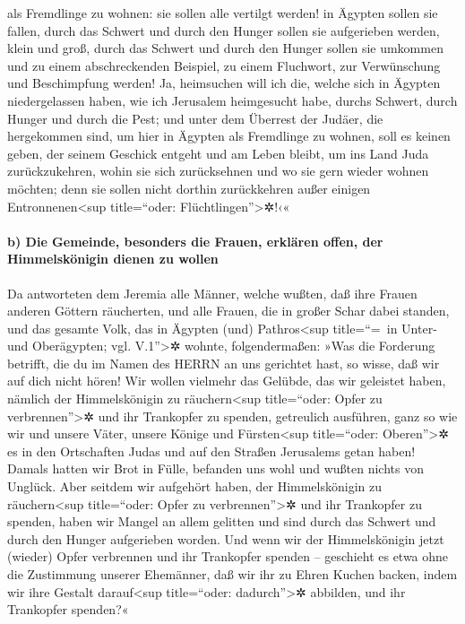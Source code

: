 als Fremdlinge zu wohnen: sie sollen alle vertilgt werden! in Ägypten
sollen sie fallen, durch das Schwert und durch den Hunger sollen sie
aufgerieben werden, klein und groß, durch das Schwert und durch den
Hunger sollen sie umkommen und zu einem abschreckenden Beispiel, zu
einem Fluchwort, zur Verwünschung und Beschimpfung werden!
Ja, heimsuchen will ich die, welche sich in Ägypten
niedergelassen haben, wie ich Jerusalem heimgesucht habe, durchs
Schwert, durch Hunger und durch die Pest; und unter dem
Überrest der Judäer, die hergekommen sind, um hier in Ägypten als
Fremdlinge zu wohnen, soll es keinen geben, der seinem Geschick entgeht
und am Leben bleibt, um ins Land Juda zurückzukehren, wohin sie sich
zurücksehnen und wo sie gern wieder wohnen möchten; denn sie sollen
nicht dorthin zurückkehren außer einigen Entronnenen\textless sup
title=``oder: Flüchtlingen''\textgreater✲!‹«

\hypertarget{b-die-gemeinde-besonders-die-frauen-erkluxe4ren-offen-der-himmelskuxf6nigin-dienen-zu-wollen}{%
\paragraph{b) Die Gemeinde, besonders die Frauen, erklären offen, der
Himmelskönigin dienen zu
wollen}\label{b-die-gemeinde-besonders-die-frauen-erkluxe4ren-offen-der-himmelskuxf6nigin-dienen-zu-wollen}}

Da antworteten dem Jeremia alle Männer, welche wußten,
daß ihre Frauen anderen Göttern räucherten, und alle Frauen, die in
großer Schar dabei standen, und das gesamte Volk, das in Ägypten (und)
Pathros\textless sup title=``=~in Unter- und Oberägypten; vgl.
V.1''\textgreater✲ wohnte, folgendermaßen: »Was die
Forderung betrifft, die du im Namen des HERRN an uns gerichtet hast, so
wisse, daß wir auf dich nicht hören! Wir wollen vielmehr
das Gelübde, das wir geleistet haben, nämlich der Himmelskönigin zu
räuchern\textless sup title=``oder: Opfer zu verbrennen''\textgreater✲
und ihr Trankopfer zu spenden, getreulich ausführen, ganz so wie wir und
unsere Väter, unsere Könige und Fürsten\textless sup title=``oder:
Oberen''\textgreater✲ es in den Ortschaften Judas und auf den Straßen
Jerusalems getan haben! Damals hatten wir Brot in Fülle, befanden uns
wohl und wußten nichts von Unglück. Aber seitdem wir
aufgehört haben, der Himmelskönigin zu räuchern\textless sup
title=``oder: Opfer zu verbrennen''\textgreater✲ und ihr Trankopfer zu
spenden, haben wir Mangel an allem gelitten und sind durch das Schwert
und durch den Hunger aufgerieben worden. Und wenn wir der
Himmelskönigin jetzt (wieder) Opfer verbrennen und ihr Trankopfer
spenden -- geschieht es etwa ohne die Zustimmung unserer Ehemänner, daß
wir ihr zu Ehren Kuchen backen, indem wir ihre Gestalt
darauf\textless sup title=``oder: dadurch''\textgreater✲ abbilden, und
ihr Trankopfer spenden?«

